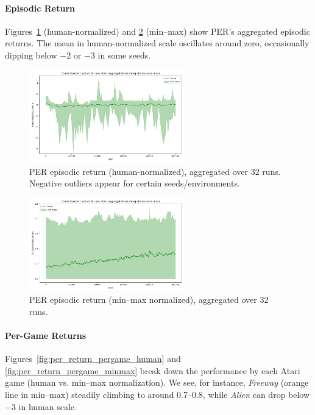 \paragraph{Episodic Return}
Figures~\ref{fig:per_return_human} (human-normalized) and \ref{fig:per_return_minmax} (min--max) show PER’s aggregated episodic returns. The mean in human-normalized scale oscillates around zero, occasionally dipping below $-2$ or $-3$ in some seeds.

\begin{figure}
	\centering
	\includegraphics[width=0.6\textwidth]{figures/per/charts_episodic_return_human_per_atari.png}
	\caption{PER episodic return (human-normalized), aggregated over 32 runs. 
		Negative outliers appear for certain seeds/environments.}
	\label{fig:per_return_human}
\end{figure}

\begin{figure}
	\centering
	\includegraphics[width=0.6\textwidth]{figures/per/charts_episodic_return_minmax_per_atari.png}
	\caption{PER episodic return (min--max normalized), aggregated over 32 runs.}
	\label{fig:per_return_minmax}
\end{figure}

\paragraph{Per-Game Returns}
Figures~\ref{fig:per_return_pergame_human} and \vref{fig:per_return_pergame_minmax} break down the performance by each Atari game (human vs. min--max normalization). We see, for instance, \emph{Freeway} (orange line in min--max) steadily climbing to around 0.7--0.8, while \emph{Alien} can drop below $-3$ in human scale. 

